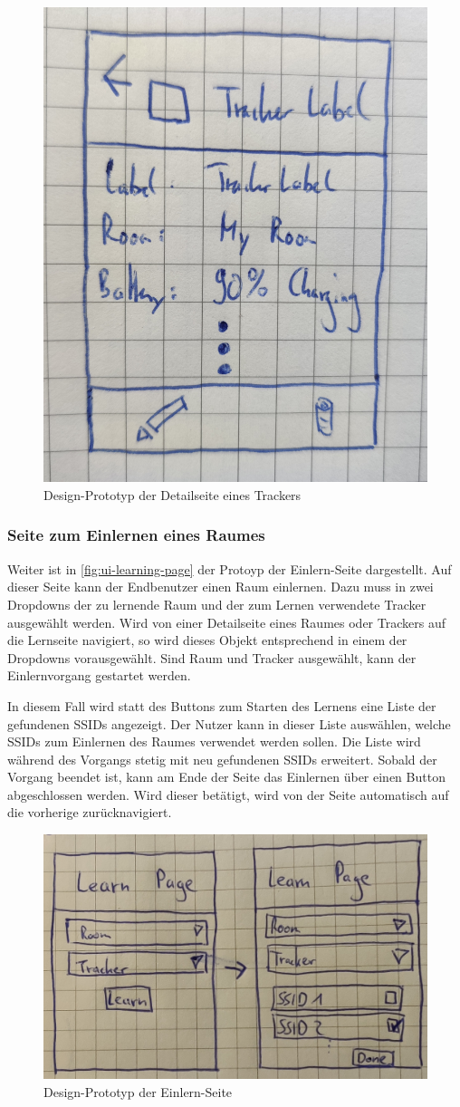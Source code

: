 \begin{figure}[h!tbp]
	\includegraphics[width=.5\textwidth]{images/ui-prototype/detail_page.jpg}
	\centering
	\caption{Design-Prototyp der Detailseite eines Trackers}
	\label{fig:ui-detail-page}
\end{figure}

\subsubsection{Seite zum Einlernen eines Raumes}

Weiter ist in \autoref{fig:ui-learning-page} der Protoyp der Einlern-Seite dargestellt.
Auf dieser Seite kann der Endbenutzer einen Raum einlernen.
Dazu muss in zwei Dropdowns der zu lernende Raum und der zum Lernen verwendete Tracker ausgewählt werden.
Wird von einer Detailseite eines Raumes oder Trackers auf die Lernseite navigiert, so wird dieses Objekt entsprechend in einem der Dropdowns vorausgewählt.
Sind Raum und Tracker ausgewählt, kann der Einlernvorgang gestartet werden.

In diesem Fall wird statt des Buttons zum Starten des Lernens eine Liste der gefundenen \glspl{SSID} angezeigt.
Der Nutzer kann in dieser Liste auswählen, welche \glspl{SSID} zum Einlernen des Raumes verwendet werden sollen.
Die Liste wird während des Vorgangs stetig mit neu gefundenen \glspl{SSID} erweitert.
Sobald der Vorgang beendet ist, kann am Ende der Seite das Einlernen über einen Button abgeschlossen werden.
Wird dieser betätigt, wird von der Seite automatisch auf die vorherige zurücknavigiert.

\begin{figure}[h!tbp]
	\includegraphics[width=.7\textwidth]{images/ui-prototype/learning_page.jpg}
	\centering
	\caption{Design-Prototyp der Einlern-Seite}
	\label{fig:ui-learning-page}
\end{figure}

